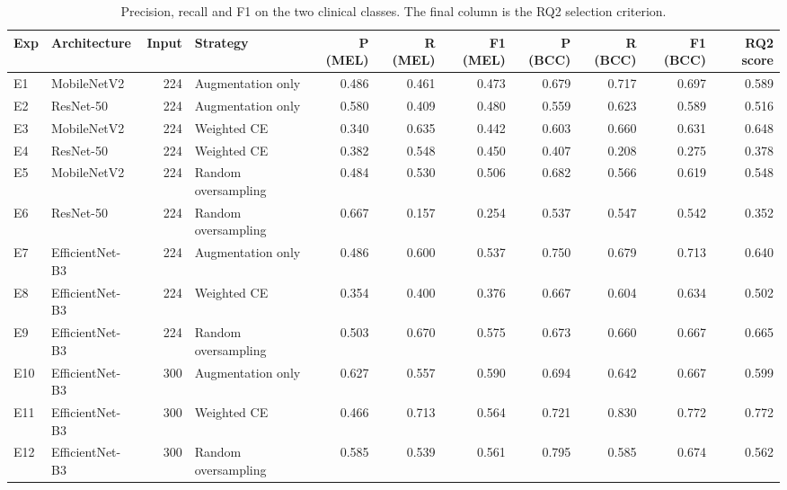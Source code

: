 \begin{table}
\caption{Precision, recall and F1 on the two clinical classes. The final column is the RQ2 selection criterion.}
\label{tab:clinical}
\begin{tabular}{llrlrrrrrrr}
\toprule
Exp & Architecture & Input & Strategy & P (MEL) & R (MEL) & F1 (MEL) & P (BCC) & R (BCC) & F1 (BCC) & RQ2 score \\
\midrule
E1 & MobileNetV2 & 224 & Augmentation only & 0.486 & 0.461 & 0.473 & 0.679 & 0.717 & 0.697 & 0.589 \\
E2 & ResNet-50 & 224 & Augmentation only & 0.580 & 0.409 & 0.480 & 0.559 & 0.623 & 0.589 & 0.516 \\
E3 & MobileNetV2 & 224 & Weighted CE & 0.340 & 0.635 & 0.442 & 0.603 & 0.660 & 0.631 & 0.648 \\
E4 & ResNet-50 & 224 & Weighted CE & 0.382 & 0.548 & 0.450 & 0.407 & 0.208 & 0.275 & 0.378 \\
E5 & MobileNetV2 & 224 & Random oversampling & 0.484 & 0.530 & 0.506 & 0.682 & 0.566 & 0.619 & 0.548 \\
E6 & ResNet-50 & 224 & Random oversampling & 0.667 & 0.157 & 0.254 & 0.537 & 0.547 & 0.542 & 0.352 \\
E7 & EfficientNet-B3 & 224 & Augmentation only & 0.486 & 0.600 & 0.537 & 0.750 & 0.679 & 0.713 & 0.640 \\
E8 & EfficientNet-B3 & 224 & Weighted CE & 0.354 & 0.400 & 0.376 & 0.667 & 0.604 & 0.634 & 0.502 \\
E9 & EfficientNet-B3 & 224 & Random oversampling & 0.503 & 0.670 & 0.575 & 0.673 & 0.660 & 0.667 & 0.665 \\
E10 & EfficientNet-B3 & 300 & Augmentation only & 0.627 & 0.557 & 0.590 & 0.694 & 0.642 & 0.667 & 0.599 \\
E11 & EfficientNet-B3 & 300 & Weighted CE & 0.466 & 0.713 & 0.564 & 0.721 & 0.830 & 0.772 & 0.772 \\
E12 & EfficientNet-B3 & 300 & Random oversampling & 0.585 & 0.539 & 0.561 & 0.795 & 0.585 & 0.674 & 0.562 \\
\bottomrule
\end{tabular}
\end{table}

